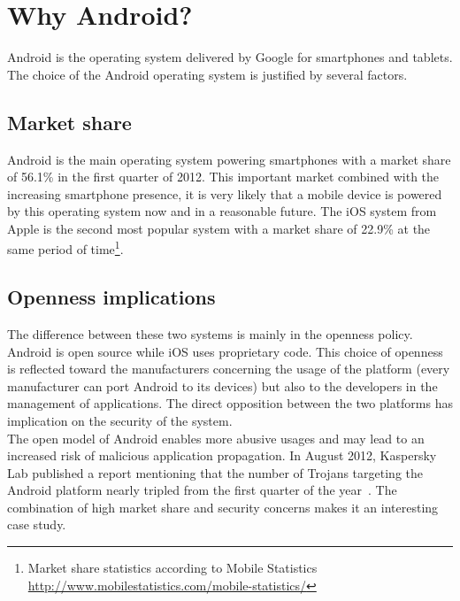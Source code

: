 \section*{Why Android?}
\label{sec:why-android}

Android is the operating system delivered by Google for smartphones and tablets.
The choice of the Android operating system is justified by several factors.\\

\subsection*{Market share}

Android is the main operating system powering smartphones with a market share of 56.1\% in the first quarter of 2012.
This important market combined with the increasing smartphone presence, it is very likely that a mobile device is powered by this operating system now and in a reasonable future.
The iOS system from Apple is the second most popular system with a market share of 22.9\% at the same period of time\footnote{Market share statistics according to Mobile Statistics \url{http://www.mobilestatistics.com/mobile-statistics/}}.\\

\subsection*{Openness implications}
The difference between these two systems is mainly in the openness policy.
Android is open source while iOS uses proprietary code.
This choice of openness is reflected toward the manufacturers concerning the usage of the platform (every manufacturer can port Android to its devices) but also to the developers in the management of applications.
The direct opposition between the two platforms has implication on the security of the system.\\

The open model of Android enables more abusive usages and may lead to an increased risk of malicious application propagation.
In August 2012, Kaspersky Lab published a report mentioning that the number of Trojans targeting the Android platform nearly tripled from the first quarter of the year~\cite{kasperskymalware}.
The combination of high market share and security concerns makes it an interesting case study.\\

